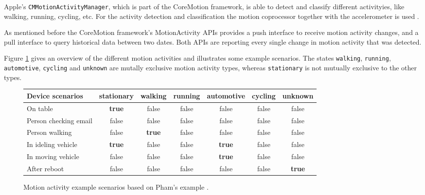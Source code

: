 Apple's \texttt{CMMotionActivityManager}, which is part of the CoreMotion framework, is able to detect and classify different activityies, like walking, running, cycling, etc.
For the activity detection and classification the motion coprocessor together with the accelerometer is used \cite{apple:wwdc_2014_pham}.

As mentioned before the CoreMotion framework's MotionActivity \acsp{API} provides a push interface to receive motion activity changes, and a pull interface to query historical data between two dates.
Both \acsp{API} are reporting every single change in motion activity that was detected.

Figure \ref{fig:motionActivity} gives an overview of the different motion activities and illustrates some example scenarios.
The states \texttt{walking}, \texttt{running}, \texttt{automotive}, \texttt{cycling} and \texttt{unknown} are mutally exclusive motion activity types, whereas \texttt{stationary} is not mutually exclusive to the other types.

\begin{center}
\begin{figure}
\begin{tabular}{l*{6}{c}}
Device scenarios & stationary & walking & running & automotive & cycling & unknown \\
\hline
On table & \textbf{true} & false & false & false & false & false\\
Person checking email & false & false & false & false & false & false\\
Person walking & false & \textbf{true} & false & false & false & false\\
In ideling vehicle & \textbf{true} & false & false & \textbf{true} & false & false\\
In moving vehicle & false & false & false & \textbf{true} & false & false\\
After reboot & false & false & false & false & false & \textbf{true}
\end{tabular}
\caption{Motion activity example scenarios based on Pham's example \cite{apple:wwdc_2014_pham}.}
\label{fig:motionActivity}
\end{figure}
\end{center}


